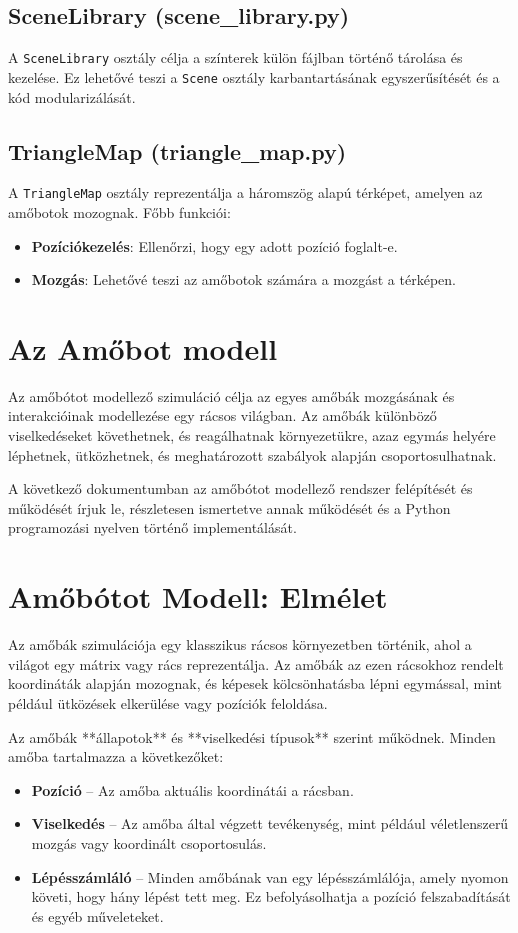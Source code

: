 \documentclass[	
  noindent
]{elteikthesis}[2024/04/26]
\begin{document}
    \subsection*{SceneLibrary (scene\_library.py)}
    A \texttt{SceneLibrary} osztály célja a színterek külön fájlban történő tárolása és kezelése. Ez lehetővé teszi a \texttt{Scene} osztály karbantartásának egyszerűsítését és a kód modularizálását.
  
    \subsection*{TriangleMap (triangle\_map.py)}
    A \texttt{TriangleMap} osztály reprezentálja a háromszög alapú térképet, amelyen az amőbotok mozognak. Főbb funkciói:
    \begin{itemize}[left=0pt]
        \item \textbf{Pozíciókezelés}: Ellenőrzi, hogy egy adott pozíció foglalt-e.
        \item \textbf{Mozgás}: Lehetővé teszi az amőbotok számára a mozgást a térképen.
    \end{itemize}

    \section{Az Amőbot modell}
    Az amőbótot modellező szimuláció célja az egyes amőbák mozgásának és interakcióinak modellezése egy rácsos világban. Az amőbák különböző viselkedéseket követhetnek, és reagálhatnak környezetükre, azaz egymás helyére léphetnek, ütközhetnek, és meghatározott szabályok alapján csoportosulhatnak.
    
    A következő dokumentumban az amőbótot modellező rendszer felépítését és működését írjuk le, részletesen ismertetve annak működését és a Python programozási nyelven történő implementálását.
    
    \section{Amőbótot Modell: Elmélet}
    Az amőbák szimulációja egy klasszikus rácsos környezetben történik, ahol a világot egy mátrix vagy rács reprezentálja. Az amőbák az ezen rácsokhoz rendelt koordináták alapján mozognak, és képesek kölcsönhatásba lépni egymással, mint például ütközések elkerülése vagy pozíciók feloldása.
    
    Az amőbák **állapotok** és **viselkedési típusok** szerint működnek. Minden amőba tartalmazza a következőket:
    \begin{itemize}
        \item \textbf{Pozíció} – Az amőba aktuális koordinátái a rácsban.
        \item \textbf{Viselkedés} – Az amőba által végzett tevékenység, mint például véletlenszerű mozgás vagy koordinált csoportosulás.
        \item \textbf{Lépésszámláló} – Minden amőbának van egy lépésszámlálója, amely nyomon követi, hogy hány lépést tett meg. Ez befolyásolhatja a pozíció felszabadítását és egyéb műveleteket.
    \end{itemize}
    
\end{document}
